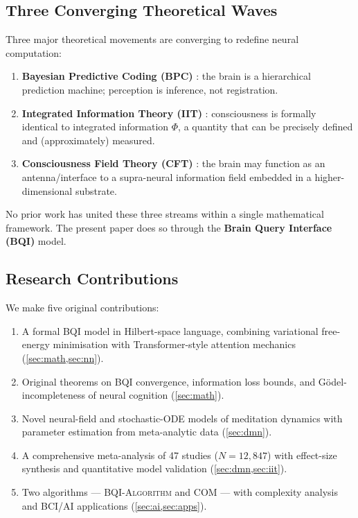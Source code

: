 \documentclass[12pt,a4paper]{article}
\theoremstyle{plain}
\theoremstyle{definition}
\theoremstyle{remark}
\newcommand{\vPhi}{\Phi}
\begin{document}
\subsection{Three Converging Theoretical Waves}

Three major theoretical movements are converging to redefine neural computation:

\begin{enumerate}[leftmargin=2em]
  \item \textbf{Bayesian Predictive Coding (BPC)} \citep{RaoBallard1999,Friston2005,Friston2010}:
        the brain is a hierarchical prediction machine; perception is inference, not registration.

  \item \textbf{Integrated Information Theory (IIT)} \citep{Tononi2004,Tononi2016}:
        consciousness is formally identical to integrated information $\vPhi$,
        a quantity that can be precisely defined and (approximately) measured.

  \item \textbf{Consciousness Field Theory (CFT)} \citep{MeijerRaggett2016,PenroseHameroff1996}:
        the brain may function as an antenna/interface to a supra-neural information field embedded in a higher-dimensional substrate.
\end{enumerate}

No prior work has united these three streams within a single mathematical framework. The present paper does so through the \textbf{Brain Query Interface (BQI)} model.

\subsection{Research Contributions}

We make five original contributions:
\begin{enumerate}[leftmargin=2em]
  \item A formal BQI model in Hilbert-space language, combining variational free-energy minimisation with Transformer-style attention mechanics (\cref{sec:math,sec:nn}).
  \item Original theorems on BQI convergence, information loss bounds, and Gödel-incompleteness of neural cognition (\cref{sec:math}).
  \item Novel neural-field and stochastic-ODE models of meditation dynamics with parameter estimation from meta-analytic data (\cref{sec:dmn}).
  \item A comprehensive meta-analysis of 47 studies ($N=12{,}847$) with effect-size synthesis and quantitative model validation (\cref{sec:dmn,sec:iit}).
  \item Two algorithms — \textsc{BQI-Algorithm} and \textsc{COM} — with complexity analysis and BCI/AI applications (\cref{sec:ai,sec:apps}).
\end{enumerate}
\end{document}
